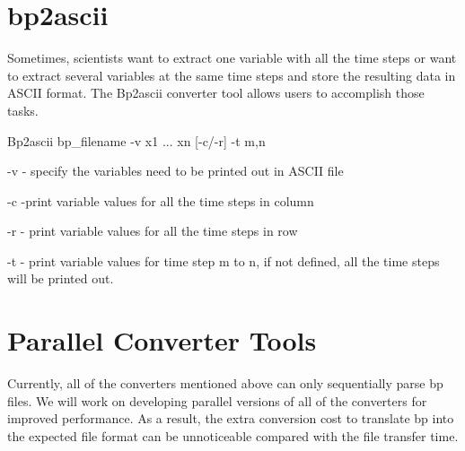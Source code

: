 \section{bp2ascii}

Sometimes, scientists want to extract one variable with all the time steps or want 
to extract several variables at the same time steps and store the resulting data 
in ASCII format. The Bp2ascii converter tool allows users to accomplish those tasks. 

Bp2ascii bp\_filename -v x1 ... xn [-c/-r] -t m,n

-v - specify the variables need to be printed out in ASCII file

-c -print variable values for all the time steps in column

-r - print variable values for all the time steps in row

-t - print variable values for time step m to n,  if not defined, all the time 
steps will be printed out.

\section{Parallel Converter Tools}

Currently, all of the converters mentioned above can only sequentially parse bp 
files. We will work on developing parallel versions of all of the converters for 
improved performance. As a result, the extra conversion cost to translate bp into 
the expected file format can be unnoticeable compared with the file transfer time. 

